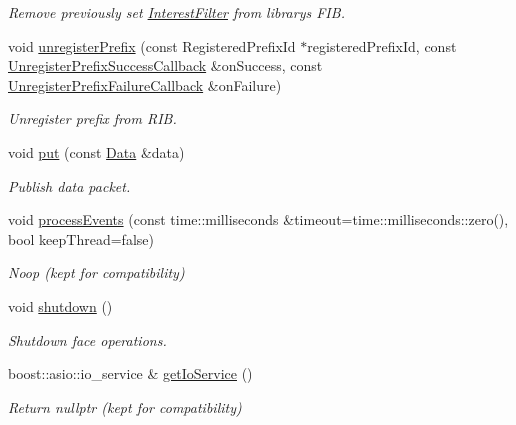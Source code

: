 \begin{DoxyCompactItemize}
\begin{DoxyCompactList}\small\item\em Remove previously set \hyperlink{classndn_1_1InterestFilter}{Interest\+Filter} from library\textquotesingle{}s F\+IB. \end{DoxyCompactList}\item 
void \hyperlink{classndn_1_1Face_ae6d4d5060f12a40b10658d6568fb6f94}{unregister\+Prefix} (const Registered\+Prefix\+Id $\ast$registered\+Prefix\+Id, const \hyperlink{namespacendn_a6781fc026448072c22454e6af8b946e0}{Unregister\+Prefix\+Success\+Callback} \&on\+Success, const \hyperlink{namespacendn_a1d6036d735c4c3504dad4f56ed174e5d}{Unregister\+Prefix\+Failure\+Callback} \&on\+Failure)
\begin{DoxyCompactList}\small\item\em Unregister prefix from R\+IB. \end{DoxyCompactList}\item 
void \hyperlink{classndn_1_1Face_a68d75bfa4d036ae685dd2c44fa309002}{put} (const \hyperlink{classndn_1_1Data}{Data} \&data)
\begin{DoxyCompactList}\small\item\em Publish data packet. \end{DoxyCompactList}\item 
void \hyperlink{classndn_1_1Face_a34608fc9ddd08808fbb16819f25a0803}{process\+Events} (const time\+::milliseconds \&timeout=time\+::milliseconds\+::zero(), bool keep\+Thread=false)\hypertarget{classndn_1_1Face_a34608fc9ddd08808fbb16819f25a0803}{}\label{classndn_1_1Face_a34608fc9ddd08808fbb16819f25a0803}

\begin{DoxyCompactList}\small\item\em Noop (kept for compatibility) \end{DoxyCompactList}\item 
void \hyperlink{classndn_1_1Face_a94cece651790f2b3e140ed157667587e}{shutdown} ()
\begin{DoxyCompactList}\small\item\em Shutdown face operations. \end{DoxyCompactList}\item 
boost\+::asio\+::io\+\_\+service \& \hyperlink{classndn_1_1Face_a517205cc925595c1a194fed7a98ebfb5}{get\+Io\+Service} ()\hypertarget{classndn_1_1Face_a517205cc925595c1a194fed7a98ebfb5}{}\label{classndn_1_1Face_a517205cc925595c1a194fed7a98ebfb5}

\begin{DoxyCompactList}\small\item\em Return nullptr (kept for compatibility) \end{DoxyCompactList}\end{DoxyCompactItemize}


